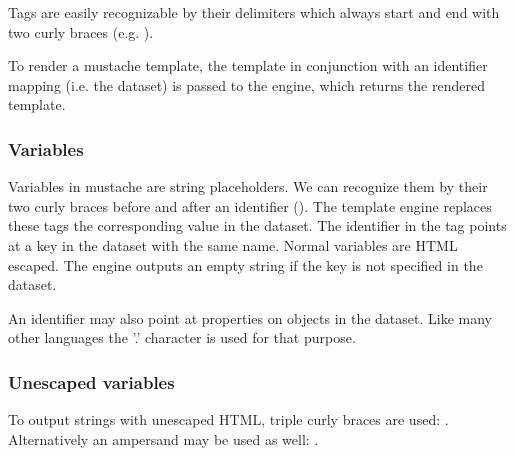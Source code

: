 \documentclass[thesis.tex]{subfiles}
\begin{document}
Tags are easily recognizable by their delimiters which always start and end with
two curly braces (e.g. ).

To render a mustache template, the template in conjunction with an
identifier mapping (i.e. the dataset) is passed to the engine, which returns the
rendered template.

\subsubsection{Variables}
Variables in mustache are string placeholders. We can recognize them by their
two curly braces before and after an identifier ().
The template engine replaces these tags the corresponding value in the dataset.
The identifier in the tag points at a key in the dataset with the same name.
Normal variables are HTML escaped. The engine outputs an empty string if the
key is not specified in the dataset.

An identifier may also point at properties on objects in the dataset. Like many
other languages the '.' character is used for that purpose.

\subsubsection{Unescaped variables}
To output strings with unescaped HTML, triple curly braces are used:
. Alternatively an ampersand may be used as well:
.
\end{document}
